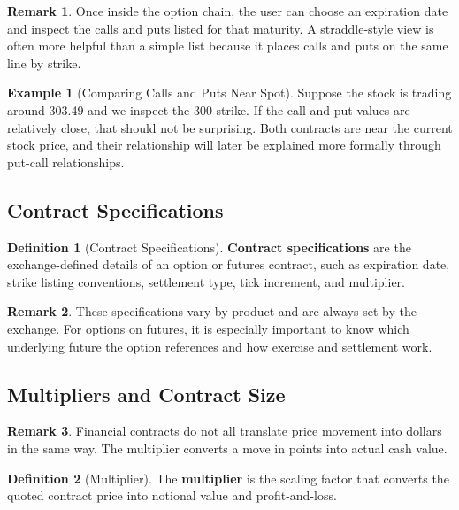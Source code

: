 \documentclass[11pt]{article}
\theoremstyle{definition}
\newtheorem{definition}{Definition}[section]
\newtheorem{example}{Example}[section]
\newtheorem{remark}{Remark}[section]
\begin{document}
\begin{remark}
Once inside the option chain, the user can choose an expiration date and inspect the calls and puts listed for that maturity. A straddle-style view is often more helpful than a simple list because it places calls and puts on the same line by strike.
\end{remark}

\begin{example}[Comparing Calls and Puts Near Spot]
Suppose the stock is trading around 303.49 and we inspect the 300 strike. If the call and put values are relatively close, that should not be surprising. Both contracts are near the current stock price, and their relationship will later be explained more formally through put-call relationships.
\end{example}

\subsection{Contract Specifications}

\begin{definition}[Contract Specifications]
\textbf{Contract specifications} are the exchange-defined details of an option or futures contract, such as expiration date, strike listing conventions, settlement type, tick increment, and multiplier.
\end{definition}

\begin{remark}
These specifications vary by product and are always set by the exchange. For options on futures, it is especially important to know which underlying future the option references and how exercise and settlement work.
\end{remark}

\subsection{Multipliers and Contract Size}

\begin{remark}
Financial contracts do not all translate price movement into dollars in the same way. The multiplier converts a move in points into actual cash value.
\end{remark}

\begin{definition}[Multiplier]
The \textbf{multiplier} is the scaling factor that converts the quoted contract price into notional value and profit-and-loss.
\end{definition}
\end{document}
